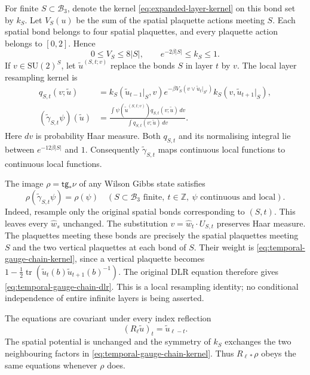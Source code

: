 \documentclass[11pt,letterpaper,reqno]{amsart}
\theoremstyle{definition}
\theoremstyle{remark}
\newcommand{\SU}{\mathrm{SU}}
\newcommand{\tr}{\operatorname{tr}}
\begin{document}
For finite $S\subset\mathcal B_3$, denote the kernel
\eqref{eq:expanded-layer-kernel} on this bond set by $k_S$. Let
$V_S(u)$ be the sum of the spatial plaquette actions meeting $S$.
Each spatial bond belongs to four spatial plaquettes, and every
plaquette action belongs to $[0,2]$. Hence
\[
 0\le V_S\le8|S|,\qquad e^{-2\beta|S|}\le k_S\le1.
\]
If $v\in\SU(2)^S$, let $\widetilde u^{(S,t;v)}$ replace the bonds
$S$ in layer $t$ by $v$. The local layer resampling kernel is
\begin{equation}\label{eq:temporal-gauge-chain-kernel}
 \begin{split}
 q_{S,t}(v;\widetilde u)
 &=k_S(\widetilde u_{t-1}|_S,v)
   e^{-\beta V_S(v\vee\widetilde u_t|_{S^c})}
   k_S(v,\widetilde u_{t+1}|_S),\\
 (\widetilde\gamma_{S,t}\psi)(\widetilde u)
 &=\frac{\int\psi(\widetilde u^{(S,t;v)})
                   q_{S,t}(v;\widetilde u)\,dv}
          {\int q_{S,t}(v;\widetilde u)\,dv}.
 \end{split}
\end{equation}
Here $dv$ is probability Haar measure. Both $q_{S,t}$ and its
normalising integral lie between $e^{-12\beta|S|}$ and $1$.
Consequently $\widetilde\gamma_{S,t}$ maps continuous local functions
to continuous local functions.

The image $\rho=\mathsf{tg}_*\nu$ of any Wilson Gibbs state satisfies
\begin{equation}\label{eq:temporal-gauge-chain-dlr}
 \rho(\widetilde\gamma_{S,t}\psi)=\rho(\psi)
 \quad(S\subset\mathcal B_3\text{ finite},\ t\in\mathbb Z,
                      \ \psi\text{ continuous and local}).
\end{equation}
Indeed, resample only the original spatial bonds corresponding to
$(S,t)$. This leaves every $\widehat w_s$ unchanged. The substitution
$v=\widehat w_t\cdot U_{S,t}$ preserves Haar measure. The plaquettes
meeting these bonds are precisely the spatial plaquettes meeting
$S$ and the two vertical plaquettes at each bond of $S$. Their
weight is \eqref{eq:temporal-gauge-chain-kernel}, since a vertical
plaquette becomes
$1-\frac12\tr(\widetilde u_t(b)\widetilde u_{t+1}(b)^{-1})$.
The original DLR equation therefore gives
\eqref{eq:temporal-gauge-chain-dlr}. This is a local resampling
identity; no conditional independence of entire infinite layers is
being asserted.

The equations are covariant under every index reflection
\[
 (R_\ell\widetilde u)_t=\widetilde u_{\ell-t}.
\]
The spatial potential is unchanged and the symmetry of $k_S$
exchanges the two neighbouring factors in
\eqref{eq:temporal-gauge-chain-kernel}. Thus $R_{\ell*}\rho$ obeys
the same equations whenever $\rho$ does.
\end{document}
